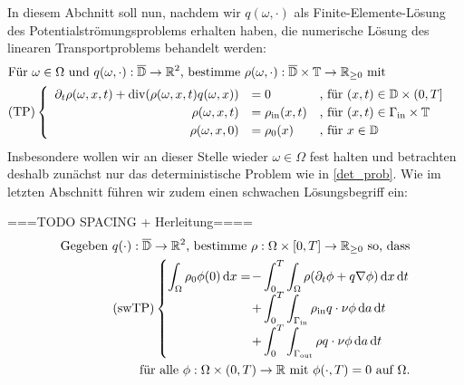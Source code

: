 
In diesem Abchnitt soll nun, nachdem wir $q(\omega,\cdot)$ als Finite-Elemente-Lösung des Potentialströmungsproblems erhalten haben, die numerische Lösung des linearen Transportproblems behandelt werden:
\begin{align*}
	&\text{Für } \omega \in \Omega \text{ und }q(\omega,\cdot): \overline{\mathbb{D}} \to \mathbb{R}^2 \text{, bestimme }\rho(\omega,\cdot): \overline{\mathbb{D}} \times \mathbb{T} \to \mathbb{R}_{\geq 0} \text{ mit} \\
	&\text{(TP)} 
	\begin{cases}
	\begin{array}{rlll}
	\partial_t \rho (\omega, x, t) + \operatorname{div}(\rho(\omega,x,t)q(\omega,x)) &= 0 &\text{, für } (x,t) \in \mathbb{D} \times (0,T] \\
	\rho(\omega,x,t) &= \rho_{\text{in}}(x,t) &\text{, für } (x,t) \in \Gamma_{\text{in}} \times \mathbb{T} \\
	\rho(\omega,x,0)  &= \rho_0(x) &\text{, für } x \in  \mathbb{D}
	\end{array}
	\end{cases} \\
\end{align*}
Insbesondere wollen wir an dieser Stelle wieder $\omega \in \Omega$ fest halten und betrachten deshalb zunächst nur das deterministische Problem wie in \ref{det_prob}.
Wie im letzten Abschnitt führen wir zudem einen schwachen Lösungsbegriff ein:


===TODO SPACING + Herleitung====
\begin{align*}
\text{Gegeben } q(\cdot) : \overline{\mathbb{D}} \to \mathbb{R}^2 \text{, bestimme } \rho:\Omega\times [0,T] \to \mathbb{R}_{\ge 0} \text{ so, dass}\\
\text{(swTP)}\begin{cases}
\displaystyle
\int_{\Omega} \rho_0 \phi(0) \, \mathrm{d} x = \mkern-16mu &- \displaystyle \int_{0}^{T} \int_{\Omega} \rho (\partial_t \phi + q \nabla \phi ) \, \mathrm{d} x \, \mathrm{d} t \\
&+\displaystyle\int_{0}^{T}  \int_{\Gamma_{\text{in}}} \rho_{\text{in}} q \cdot \nu \phi \, \mathrm{d} a  \, \mathrm{d} t \\
&+\displaystyle\int_{0}^{T}  \int_{\Gamma_{\text{out}}} \rho q \cdot \nu \phi \, \mathrm{d} a  \, \mathrm{d} t
\end{cases}	\\
\text{ für alle } \phi: \Omega \times (0,T) \to \mathbb{R} \text{ mit } \phi(\cdot,T) = 0 \text{ auf } \Omega.
\end{align*}


